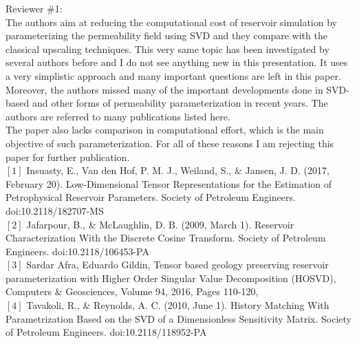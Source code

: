 \documentclass[11pt]{letter} %
\begin{document}
\begin{letter}
Reviewer \#1: \\
The authors aim at reducing the computational cost of reservoir simulation by parameterizing the permeability field using SVD and they compare with the classical upscaling techniques. This very same topic has been investigated by several authors before and I do not see anything new in this presentation. It uses a very simplistic approach and many important questions are left in this paper. Moreover, the authors missed many of the important developments done in SVD-based and other forms of permeability  parameterization in recent years. The authors are referred to many publications listed here.\\
The paper also lacks comparison in computational effort, which is the main objective of such parameterization. For all of these reasons I am rejecting this paper for further publication.\\
$[1]$ Insuasty, E., Van den Hof, P. M. J., Weiland, S., \& Jansen, J. D. (2017, February 20). Low-Dimensional Tensor Representations for the Estimation of Petrophysical Reservoir Parameters. Society of Petroleum Engineers. doi:10.2118/182707-MS\\
$[2]$ Jafarpour, B., \& McLaughlin, D. B. (2009, March 1). Reservoir Characterization With the Discrete Cosine Transform. Society of Petroleum Engineers. doi:10.2118/106453-PA\\
$[3]$ Sardar Afra, Eduardo Gildin, Tensor based geology preserving reservoir parameterization with Higher Order Singular Value Decomposition (HOSVD), Computers \& Geosciences, Volume 94, 2016, Pages 110-120,\\
$[4]$  Tavakoli, R., \& Reynolds, A. C. (2010, June 1). History Matching With Parametrization Based on the SVD of a Dimensionless Sensitivity Matrix. Society of Petroleum Engineers. doi:10.2118/118952-PA\\



\end{letter}
\end{document}
